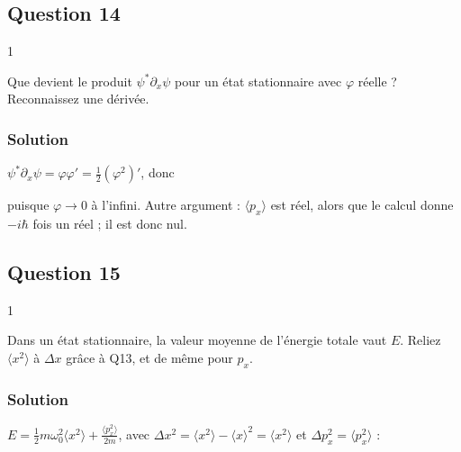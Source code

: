 \documentclass[11pt,a4paper]{article}
\newcommand{\equationajustee}[1]{%
  \sbox{\boiteequation}{$\displaystyle #1$}%
  \ifdim\wd\boiteequation>\linewidth
    \[\resizebox{\linewidth}{!}{\usebox{\boiteequation}}\]%
  \else
    \[#1\]%
  \fi}
\begin{document}
\hypertarget{question-14}{%
\subsection{Question 14}\label{question-14}}

\begin{indication}{1}

Que devient le produit \(\psi^*\partial_x\psi\) pour un état stationnaire avec \(\varphi\) réelle ? Reconnaissez une dérivée.

\end{indication}

\hypertarget{solution-13}{%
\subsubsection{Solution}\label{solution-13}}

\(\psi^*\partial_x\psi=\varphi\varphi'=\frac12(\varphi^2)'\), donc

\equationajustee{\langle p_x\rangle=-i\hbar\left[\frac{\varphi^2}{2}\right]_{-\infty}^{+\infty}=0}

puisque \(\varphi\to0\) à l'infini. Autre argument : \(\langle p_x\rangle\) est réel, alors que le calcul donne \(-i\hbar\) fois un réel ; il est donc nul.

\equationajustee{\boxed{\langle p_x\rangle=0}}

\hypertarget{question-15}{%
\subsection{Question 15}\label{question-15}}

\begin{indication}{1}

Dans un état stationnaire, la valeur moyenne de l'énergie totale vaut \(E\). Reliez \(\langle x^2\rangle\) à \(\Delta x\) grâce à Q13, et de même pour \(p_x\).

\end{indication}

\hypertarget{solution-14}{%
\subsubsection{Solution}\label{solution-14}}

\(E=\frac12m\omega_0^2\langle x^2\rangle+\frac{\langle p_x^2\rangle}{2m}\), avec \(\Delta x^2=\langle x^2\rangle-\langle x\rangle^2=\langle x^2\rangle\) et \(\Delta p_x^2=\langle p_x^2\rangle\) :
\end{document}
